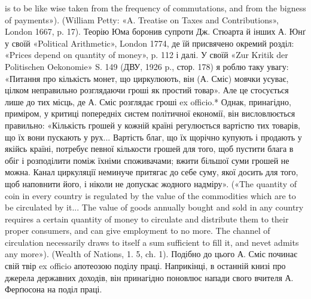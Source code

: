 is to be like wise taken from the frequency of commutations, and from
the bigness of payments»). (William Petty: «A. Treatise on Taxes and
Contributions», London 1667, p. 17). Теорію Юма боронив супроти
Дж. Стюарта й інших А. Юнґ у своїй «Political Arithmetic», London
1774, де їй присвячено окремий розділ: «Prices depend on quantity of
money», p. 112 і далі. У своїй «Zur Kritik der Politischen Oekonomie»
S. 149 (ДВУ, 1926 p., стор. 178) я роблю таку увагу: «Питання про кількість
монет, що циркулюють, він (А. Сміс) мовчки усуває, цілком неправильно
розглядаючи гроші як простий товар». Але це стосується лише
до тих місць, де А. Сміс розглядає гроші ex officio.* Однак, принагідно,
приміром, у критиці попередніх систем політичної економії, він висловлюється
правильно: «Кількість грошей у кожній країні регулюється вартістю
тих товарів, що їх вони пускають у рух... Вартість благ, що їх щорічно
купують і продають у якійсь країні, потребує певної кількости грошей
для того, щоб пустити блага в обіг і розподілити поміж їхніми споживачами;
вжити більшої суми грошей не можна. Канал циркуляції
неминуче притягає до себе суму, якої досить для того, щоб наповнити
його, і ніколи не допускає жодного надміру». («The quantity of coin in
every country is regulated by the value of the commodities which are to
be circulated by it... The value of goods annually bought and sold in any
country requires a certain quantity of money to circulate and distribute
them to their proper consumers, and can give employment to no more. The
channel of circulation necessarily draws to itself a sum sufficient to fill
it, and nevet admits any more»). (Wealth of Nations, 1. 5, ch. 1). Подібно
до цього А. Сміс починає свій твір ex officio апотеозою поділу праці. Наприкінці,
в останній книзі про джерела державних доходів, він принагідно
поновлює напади свого вчителя А. Ферґюсона на поділ праці.
\parbreak{}  %
